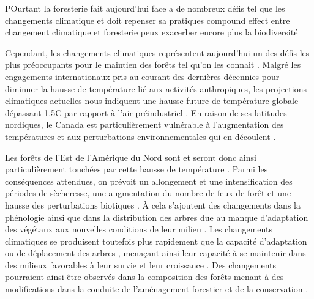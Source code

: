 POurtant la foresterie fait aujourd'hui face a de nombreux défis tel que les changements climatique et doit repenser sa pratiques
compound effect entre changement climatique et foresterie peux exacerber encore plus la biodiversité

Cependant, les changements climatiques représentent aujourd'hui un des défis les plus préoccupants pour le maintien des forêts tel qu'on les connait \citep{McKenney2009Climatechange,Trumbore2015Foresthealth,Seidl2017Forestdisturbances,Messier2022Warningnatural}.  
Malgré les engagements internationaux pris au courant des dernières décennies pour diminuer la hausse de température lié aux activités anthropiques, 
les projections climatiques actuelles nous indiquent une hausse future de température globale dépassant 1.5C par rapport à l'air préindustriel \citep{Matthews2022Currentglobal}.
En raison de ses latitudes nordiques, le Canada est particulièrement vulnérable à l'augmentation des températures et aux perturbations environnementales qui en découlent \citep{Alo2008Potentialfuture,Bush2019Canadachanging}. 

Les forêts de l'Est de l'Amérique du Nord sont et seront donc ainsi particulièrement touchées par cette hausse de température \citep{Park2014Canboreal,Mahony2017closerlook,Sittaro2017Treerange,Messier2022Warningnatural}.
Parmi les conséquences attendues, on prévoit un allongement et une intensification des périodes de sècheresse, une augmentation du nombre de feux de forêt et une hausse des perturbations biotiques \citep{Parmesan2007Influencesspecies,Joyce2013Climatechange,Gatti2021Amazoniacarbon,Heidari2021Effectsclimate}. 
À cela s'ajoutent des changements dans la phénologie \citep{Chuine2010Whydoes} ainsi que dans la distribution des arbres \citep{Zhu2012Failuremigrate,Gray2013Trackingsuitable} due au manque d'adaptation des végétaux aux nouvelles conditions de leur milieu \citep{Aitken2008Adaptationmigration}.
Les changements climatiques se produisent toutefois plus rapidement que la capacité d'adaptation ou de déplacement des arbres \citep{Aitken2008Adaptationmigration,Loarie2009velocityclimate,Vitt2010Assistedmigration,Harrison2020Plantcommunity}, 
menaçant ainsi leur capacité à se maintenir dans des milieux favorables à leur survie et leur croissance \citep{Zhu2012Failuremigrate,Sittaro2017Treerange,Woodall2018Decadalchanges}.
Des changements pourraient ainsi être observés dans la composition des forêts menant à des modifications dans la conduite de l'aménagement forestier et de la conservation \citep{McKenney2009Climatechange,Chmura2011Forestresponses,Lo2011Linkingclimate}.


